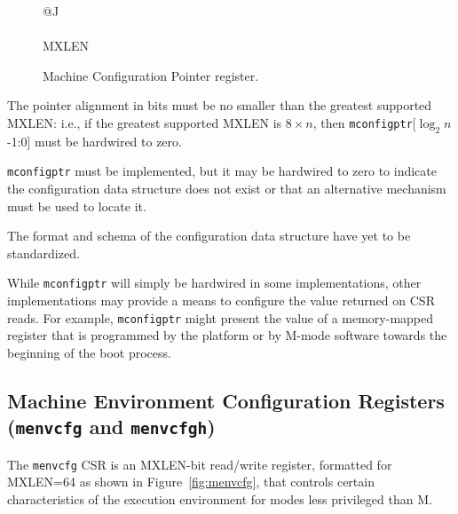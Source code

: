 \begin{figure}[h!]
{\footnotesize
\begin{center}
\begin{tabular}{@{}J}
 \\
\hline
{} \\
\hline
MXLEN \\
\end{tabular}
\end{center}
}
\vspace{-0.1in}
\caption{Machine Configuration Pointer register.}
\label{mconfigptrreg}
\end{figure}

The pointer alignment in bits must be no smaller than the greatest supported
MXLEN: i.e., if the greatest supported MXLEN is $8\times n$, then
{\tt mconfigptr}[$\log_2n$-1:0] must be hardwired to zero.

{\tt mconfigptr} must be implemented, but it may be hardwired to zero to
indicate the configuration data structure does not exist or that an
alternative mechanism must be used to locate it.

\begin{commentary}
The format and schema of the configuration data structure have yet to be standardized.
\end{commentary}

\begin{commentary}
While {\tt mconfigptr} will simply be hardwired in some implementations, other
implementations may provide a means to configure the value returned on CSR
reads.
For example, {\tt mconfigptr} might present the value of a memory-mapped
register that is programmed by the platform or by M-mode software towards the
beginning of the boot process.
\end{commentary}

\subsection{%
 Machine Environment Configuration Registers
 ({\tt menvcfg} and {\tt menvcfgh})%
}

The {\tt menvcfg} CSR is an MXLEN-bit read/write register,
formatted for MXLEN=64 as shown in Figure~\ref{fig:menvcfg},
that controls certain characteristics of the execution environment
for modes less privileged than M.


